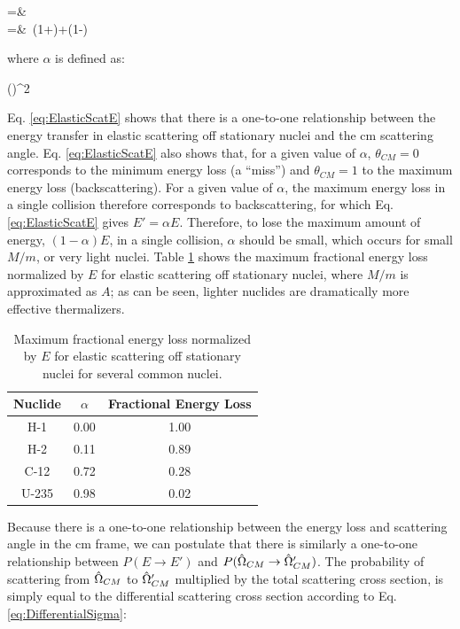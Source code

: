 \beqa
\label{eq:ElasticScatE}
=&\ \\
=&\ \left\lbrack(1+\alpha)+(1-\alpha)\right\rbrack\\
\eeqa

where \(\alpha\) is defined as:

\beq
\alpha\equiv\left(\right)^2
\eeq

Eq. \eqref{eq:ElasticScatE} shows that there is a one-to-one relationship between the energy transfer in elastic scattering off stationary nuclei and the \gls{cm} scattering angle. Eq. \eqref{eq:ElasticScatE} also shows that, for a given value of \(\alpha\), \(\theta_{CM}=0\) corresponds to the minimum energy loss (a ``miss'') and \(\theta_{CM}=1\) to the maximum energy loss (backscattering). For a given value of \(\alpha\), the maximum energy loss in a single collision therefore corresponds to backscattering, for which Eq. \eqref{eq:ElasticScatE} gives \(E'=\alpha E\). Therefore, to lose the maximum amount of energy, \((1-\alpha)E\), in a single collision, \(\alpha\) should be small, which occurs for small \(M/m\), or very light nuclei. Table \ref{table:FractionalEnergyLoss} shows the maximum fractional energy loss normalized by \(E\) for elastic scattering off stationary nuclei, where \(M/m\) is approximated as \(A\); as can be seen, lighter nuclides are dramatically more effective thermalizers.

\begin{table}[H]
\caption{Maximum fractional energy loss normalized by \(E\) for elastic scattering off stationary nuclei for several common nuclei.}
\centering
\begin{tabular}{c c c}
\hline\hline
Nuclide & \(\alpha\) & Fractional Energy Loss\\ [0.5ex]
\hline
H-1 & 0.00 & 1.00\\
H-2 & 0.11 & 0.89\\
C-12 & 0.72 & 0.28\\
U-235 & 0.98 & 0.02\\
\hline
\end{tabular}
\label{table:FractionalEnergyLoss}
\end{table}

Because there is a one-to-one relationship between the energy loss and scattering angle in the \gls{cm} frame, we can postulate that there is similarly a one-to-one relationship between \(P(E\rightarrow E')\) and \(P(\hat{\Omega}_{CM}\rightarrow\hat{\Omega}_{CM}')\). The probability of scattering from \(\hat{\Omega}_{CM}\) to \(\hat{\Omega}'_{CM}\) multiplied by the total scattering cross section, is simply equal to the differential scattering cross section according to Eq. \eqref{eq:DifferentialSigma}:


